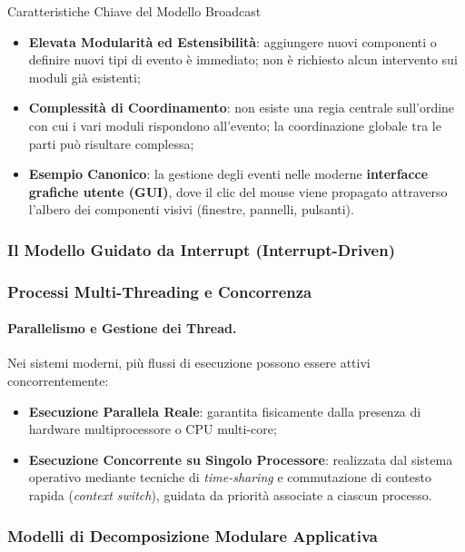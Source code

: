 \documentclass[12pt]{extarticle}
\begin{document}
\begin{cbox}{Caratteristiche Chiave del Modello Broadcast}
\begin{itemize}
    \item \textbf{Elevata Modularità ed Estensibilità}: aggiungere nuovi componenti o definire nuovi tipi di evento è immediato; non è richiesto alcun intervento sui moduli già esistenti;
    \item \textbf{Complessità di Coordinamento}: non esiste una regia centrale sull'ordine con cui i vari moduli rispondono all'evento; la coordinazione globale tra le parti può risultare complessa;
    \item \textbf{Esempio Canonico}: la gestione degli eventi nelle moderne \textbf{interfacce grafiche utente (GUI)}, dove il clic del mouse viene propagato attraverso l'albero dei componenti visivi (finestre, pannelli, pulsanti).
\end{itemize}
\end{cbox}

\subsubsection{Il Modello Guidato da Interrupt (Interrupt-Driven)}

\subsubsection{Processi Multi-Threading e Concorrenza}

\paragraph{Parallelismo e Gestione dei Thread.}
Nei sistemi moderni, più flussi di esecuzione possono essere attivi concorrentemente:
\begin{itemize}
    \item \textbf{Esecuzione Parallela Reale}: garantita fisicamente dalla presenza di hardware multiprocessore o CPU multi-core;
    \item \textbf{Esecuzione Concorrente su Singolo Processore}: realizzata dal sistema operativo mediante tecniche di \textit{time-sharing} e commutazione di contesto rapida (\textit{context switch}), guidata da priorità associate a ciascun processo.
\end{itemize}

\subsubsection{Modelli di Decomposizione Modulare Applicativa}
\end{document}
